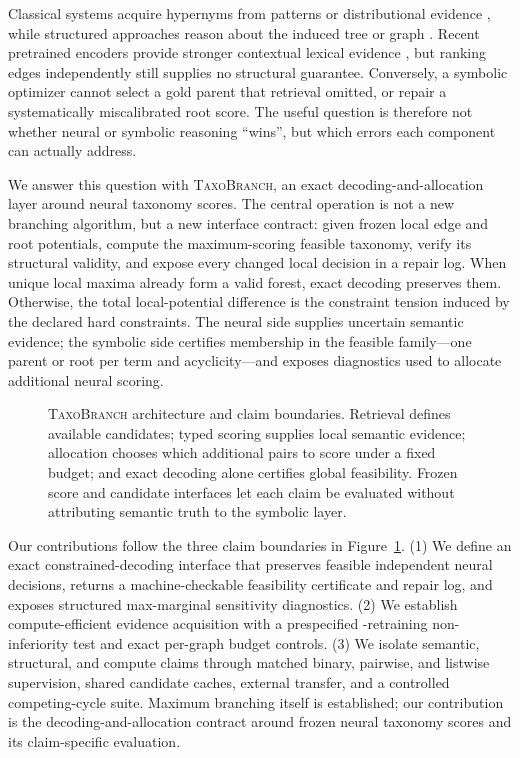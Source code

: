 \documentclass[11pt]{article}
\newcommand{\method}{\textsc{TaxoBranch}}
\begin{document}
Classical systems acquire hypernyms from patterns or distributional evidence
\citep{hearst-1992-automatic,panchenko-etal-2016-taxi}, while structured
approaches reason about the induced tree or graph
\citep{bansal-etal-2014-structured,mao-etal-2018-end}.  Recent pretrained encoders provide stronger contextual lexical evidence
\citep{he2021deberta}, but ranking edges independently still supplies no
structural guarantee. Conversely, a symbolic optimizer cannot select a gold parent
that retrieval omitted, or repair a systematically miscalibrated root score.
The useful question is therefore not whether neural or symbolic reasoning
``wins'', but which errors each component can actually address.

We answer this question with \method, an exact decoding-and-allocation layer
around neural taxonomy scores. The central operation is not a new branching
algorithm, but a new interface contract: given frozen local edge and root
potentials, compute the maximum-scoring feasible taxonomy, verify its
structural validity, and expose every changed local decision in a repair log.
When unique local maxima already form a valid forest, exact decoding preserves
them. Otherwise, the total local-potential difference is the constraint
tension induced by the declared hard constraints. The neural side supplies uncertain semantic
evidence; the symbolic side certifies membership in the feasible family---one
parent or root per term and acyclicity---and exposes diagnostics used to
allocate additional neural scoring.

\begin{figure}[t]
\centering

\caption{\method{} architecture and claim boundaries. Retrieval defines available
candidates; typed scoring supplies local semantic evidence; allocation chooses which
additional pairs to score under a fixed budget; and exact decoding alone certifies
global feasibility. Frozen score and candidate interfaces let each claim be evaluated
without attributing semantic truth to the symbolic layer.}
\label{fig:pipeline}
\end{figure}

Our contributions follow the three claim boundaries in Figure~\ref{fig:pipeline}.
(1) We define an exact constrained-decoding interface that preserves feasible
independent neural decisions, returns a machine-checkable feasibility certificate
and repair log, and exposes structured max-marginal sensitivity diagnostics. (2) We
establish compute-efficient evidence acquisition with a prespecified \NISeeds{}-retraining
non-inferiority test and exact per-graph budget controls. (3) We isolate
semantic, structural, and compute claims through matched binary, pairwise, and listwise
supervision, shared candidate caches, external transfer, and a controlled
competing-cycle suite. Maximum branching itself is established; our
contribution is the decoding-and-allocation contract around frozen neural
taxonomy scores and its claim-specific evaluation.
\end{document}
